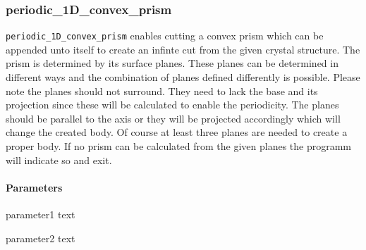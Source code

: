 \subsubsection{periodic_1D_convex_prism}
\lstinline{periodic_1D_convex_prism} enables cutting a convex prism which can be appended unto itself to create an infinte cut from the given crystal structure. The prism is determined by its surface planes. These planes can be determined in different ways and the combination of planes defined differently is possible. Please note the planes should not surround. They need to lack the base and its projection since these will be calculated to enable the periodicity. The planes should be parallel to the axis or they will be projected accordingly which will change the created body. Of course at least three planes are needed to create a proper body. If no prism can be calculated from the given planes the programm will indicate so and exit.
\paragraph{Parameters}
\begin{description}
 \item{parameter1} text
 \item{parameter2} text
\end{description}



